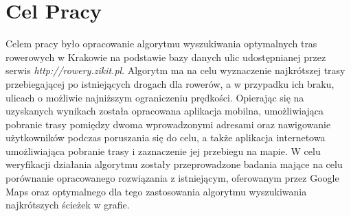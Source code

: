 \chapter{Cel Pracy}
\label{cha:cel_pracy}

Celem pracy było opracowanie algorytmu wyszukiwania optymalnych tras rowerowych w Krakowie na podstawie bazy danych ulic udostępnianej przez serwis \textit{http://rowery.zikit.pl}. Algorytm ma na celu wyznaczenie najkrótszej trasy przebiegającej po istniejących drogach dla rowerów, a w przypadku ich braku, ulicach o możliwie najniższym ograniczeniu prędkości. Opierając się na uzyskanych wynikach została opracowana aplikacja mobilna, umożliwiająca pobranie trasy pomiędzy dwoma wprowadzonymi adresami oraz nawigowanie użytkowników podczas poruszania się do celu, a także aplikacja internetowa umożliwiająca pobranie trasy i zaznaczenie jej przebiegu na mapie. W celu weryfikacji działania algorytmu zostały przeprowadzone badania mające na celu porównanie opracowanego rozwiązania z istniejącym, oferowanym przez Google Maps oraz optymalnego dla tego zastosowania algorytmu wyszukiwania najkrótszych ścieżek w grafie.